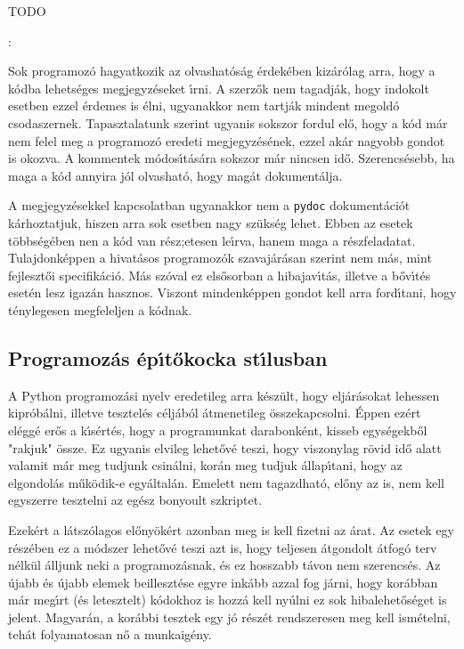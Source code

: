 TODO

:

Sok programoz\'o hagyatkozik az olvashat\'os\'ag \'erdek\'eben kiz\'ar\'olag arra, hogy a k\'odba 
lehets\'eges megjegyz\'eseket \'{\i}rni. A szerz\H{o}k nem tagadj\'ak, hogy indokolt esetben 
ezzel \'erdemes is \'elni, ugyanakkor nem tartj\'ak mindent megold\'o csodaszernek. Tapasztalatunk 
szerint ugyanis sokszor fordul el\H{o}, hogy a k\'od m\'ar nem felel meg a programoz\'o eredeti 
megjegyz\'es\'enek, ezzel ak\'ar nagyobb gondot is okozva. A kommentek m\'odos\'{\i}t\'as\'ara 
sokszor m\'ar nincsen id\H{o}. Szerencs\'esebb, ha maga a k\'od annyira j\'ol olvashat\'o, hogy 
mag\'at dokument\'alja. 

A megjegyz\'esekkel kapcsolatban ugyanakkor nem a {\tt pydoc} dokument\'aci\'ot k\'arhoztatjuk, 
hiszen arra sok esetben nagy sz\"uks\'eg lehet. Ebben az esetek t\"obbs\'eg\'eben nen a k\'od 
van r\'esz;etesen le\'{\i}rva, hanem maga a r\'eszfeladatat. Tulajdonk\'eppen a hivat\'asos 
programoz\'ok szavaj\'ar\'asan szerint nem m\'as, mint fejleszt\H{o}i specifik\'aci\'o. M\'as 
sz\'oval ez els\H{o}sorban a hibajav\'{\i}t\'as, illetve a b\H{o}v\'{\i}t\'es eset\'en lesz 
igaz\'an hasznos. Viszont mindenk\'eppen gondot kell arra ford\'{\i}tani, hogy t\'enylegesen 
megfeleljen a k\'odnak.

\subsection{Programoz\'as \'ep\'{\i}t\H{o}kocka st\'{\i}lusban}

A Python programoz\'asi nyelv eredetileg arra k\'esz\"ult, hogy elj\'ar\'asokat lehessen 
kipr\'ob\'alni, illetve tesztel\'es c\'elj\'ab\'ol \'atmenetileg \"osszekapcsolni. 
\'Eppen ez\'ert el\'egg\'e er\H{o}s a k\'{\i}s\'ert\'es, hogy a programunkat darabonk\'ent, 
kisseb egys\'egekb\H{o}l "rakjuk" \"ossze. Ez ugyanis elvileg lehet\H{o}v\'e teszi, hogy 
viszonylag r\"ovid id\H{o} alatt valamit m\'ar meg tudjunk csin\'alni, kor\'an meg tudjuk 
\'allap\'{\i}tani, hogy az elgondol\'as m\H{u}k\"odik-e egy\'altal\'an. Emelett nem tagazdhat\'o, 
el\H{o}ny az is, nem kell egyszerre tesztelni az eg\'esz bonyoult szkriptet. 

Ezek\'ert a l\'atsz\'olagos el\H{o}ny\"ok\'ert azonban meg is kell fizetni az \'arat. Az esetek
egy r\'esz\'eben ez a m\'odszer lehet\H{o}v\'e teszi azt is, hogy teljesen \'atgondolt \'atfog\'o 
terv n\'elk\"ul \'alljunk neki a programoz\'asnak, \'es ez hosszabb t\'avon nem szerencs\'es. Az 
\'ujabb \'es \'ujabb elemek beilleszt\'ese egyre ink\'abb azzal fog j\'arni, hogy kor\'abban 
m\'ar meg\'{\i}rt (\'es letesztelt) k\'odokhoz is hozz\'a kell ny\'ulni ez sok hibalehet\H{o}s\'eget 
is jelent. Magyar\'an, a kor\'abbi tesztek egy j\'o r\'esz\'et rendszeresen meg kell ism\'etelni, 
teh\'at folyamatosan n\H{o} a munkaig\'eny. 


